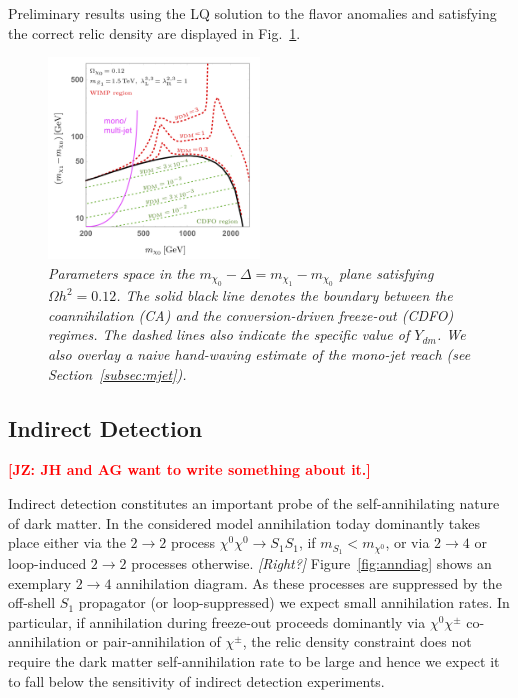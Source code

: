 \documentclass[11pt]{cernrep}
\def\JZ#1{{\bf  \textcolor{red}{[JZ: {#1}]}}}
\newcommand{\com}[1]{\emph{\color{red}[#1]}}  	%
\begin{document}
Preliminary results using the LQ solution to the flavor anomalies and satisfying the correct relic density are displayed in Fig.~\ref{fig:CDFO_WIMP}.

 \begin{figure}[!htp]
  \centering
  \includegraphics[width=0.5\textwidth]{./figures/CDFO_WIMP_region_toyMJ_v1.png} 
  \caption{\it Parameters space in the $m_{\chi_0} - \Delta = m_{\chi_1} - m_{\chi_0}$ plane satisfying $\Omega h^2 = 0.12$. The solid black line denotes the boundary between the coannihilation (CA) and the conversion-driven freeze-out (CDFO) regimes. The dashed lines also indicate the specific value of $Y_{dm}$. We also overlay a naive hand-waving estimate of the mono-jet reach (see Section~\ref{subsec:mjet}).}
\label{fig:CDFO_WIMP}
\end{figure}



\subsection{Indirect Detection}

\JZ{JH and AG want to write something about it.}

Indirect detection constitutes an important probe of the self-annihilating nature of dark matter. 
In the considered model annihilation today dominantly takes place either via the $2\to2$ process 
$\chi^0 \chi^0 \to S_1 S_1$, if $m_{S_1}< m_{\chi^0}$, or 
via $2\to 4$ or loop-induced $2\to2$ processes otherwise. \com{Right?} 
Figure~\ref{fig:anndiag} shows an exemplary $2\to 4$ annihilation 
diagram. As these processes are suppressed by the off-shell $S_1$ propagator (or loop-suppressed)
we expect small annihilation rates.
In particular, if annihilation during freeze-out proceeds dominantly via $\chi^0 \chi^\pm$ co-annihilation or 
pair-annihilation of $\chi^\pm$, the relic density constraint does not require the dark matter self-annihilation 
rate to be large and hence we expect it to fall below the sensitivity of indirect detection experiments.
\end{document}
